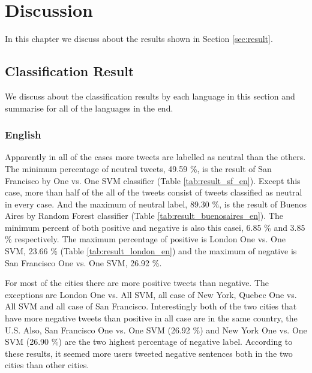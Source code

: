 \chapter{Discussion}
In this chapter we discuss about the results shown in Section \ref{sec:result}.
\section{Classification Result}\label{sec:clf_result}
We discuss about the classification results by each language in this section and summarise for all of the languages in the end.
\subsection{English}
Apparently in all of the cases more tweets are labelled as neutral than the others.
The minimum percentage of neutral tweets, 49.59 \%, is the result of San Francisco by One vs. One SVM classifier (Table \ref{tab:result_sf_en}).
Except this case, more than half of the all of the tweets consist of tweets classified as neutral in every case.
And the maximum of neutral label, 89.30 \%, is the result of Buenos Aires by Random Forest classifier (Table \ref{tab:result_buenosaires_en}).
The minimum percent of both positive and negative is also this casei, 6.85 \% and 3.85 \% respectively.
The maximum percentage of positive is London One vs. One SVM, 23.66 \% (Table \ref{tab:result_london_en}) and the maximum of negative is San Francisco One vs. One SVM, 26.92 \%.


For most of the cities there are more positive tweets than negative.
The exceptions are London One vs. All SVM, all case of New York, Quebec One vs. All SVM and all case of San Francisco.
Interestingly both of the two cities that have more negative tweets than positive in all case are in the same country, the U.S.
Also, San Francisco One vs. One SVM (26.92 \%) and New York One vs. One SVM (26.90 \%) are the two highest percentage of negative label.
According to these results, it seemed more users tweeted negative sentences both in the two cities than other cities.
